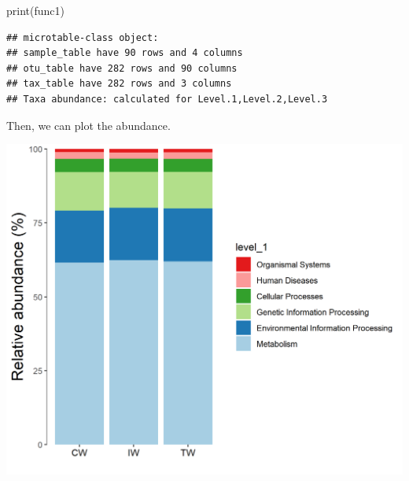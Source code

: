 \documentclass[
]{book}
\newenvironment{Shaded}{\begin{snugshade}}{\end{snugshade}}
\newcommand{\AttributeTok}[1]{\textcolor[rgb]{0.77,0.63,0.00}{#1}}
\newcommand{\CommentTok}[1]{\textcolor[rgb]{0.56,0.35,0.01}{\textit{#1}}}
\newcommand{\ConstantTok}[1]{\textcolor[rgb]{0.00,0.00,0.00}{#1}}
\newcommand{\FunctionTok}[1]{\textcolor[rgb]{0.00,0.00,0.00}{#1}}
\newcommand{\NormalTok}[1]{#1}
\newcommand{\OtherTok}[1]{\textcolor[rgb]{0.56,0.35,0.01}{#1}}
\newcommand{\SpecialCharTok}[1]{\textcolor[rgb]{0.00,0.00,0.00}{#1}}
\newcommand{\StringTok}[1]{\textcolor[rgb]{0.31,0.60,0.02}{#1}}
\begin{document}
\begin{Shaded}
\begin{Highlighting}[]
\FunctionTok{print}\NormalTok{(func1)}
\end{Highlighting}
\end{Shaded}

\begin{verbatim}
## microtable-class object:
## sample_table have 90 rows and 4 columns
## otu_table have 282 rows and 90 columns
## tax_table have 282 rows and 3 columns
## Taxa abundance: calculated for Level.1,Level.2,Level.3
\end{verbatim}

Then, we can plot the abundance.

\begin{Shaded}
\end{Shaded}

\begin{center}\includegraphics[width=600px]{Images/plot_bar_tax4fun1} \end{center}
\end{document}
